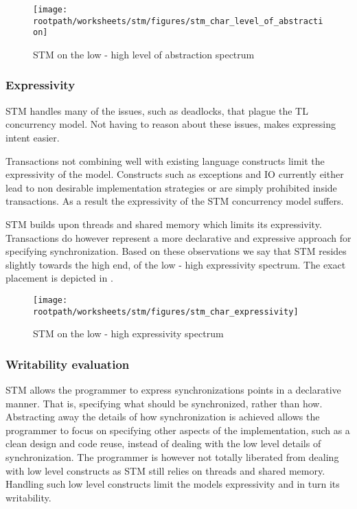 \begin{figure}[htbp]
\centering
 \texttt{[image: \\rootpath/worksheets/stm/figures/stm\_char\_level\_of\_abstraction]} 
 \caption{\ac{STM} on the low - high level of abstraction spectrum}
\label{fig:char_stm_level_of_abstraction}
\end{figure}

\subsubsection{Expressivity}\label{sec:stm_expressivity}

\ac{STM} handles many of the issues, such as deadlocks, that plague the \ac{TL} concurrency model. Not having to reason about these issues, makes expressing intent easier. 

Transactions not combining well with existing language constructs limit the expressivity of the model. Constructs such as exceptions and \ac{IO} currently either lead to non desirable implementation strategies or are simply prohibited inside transactions. As a result the expressivity of the \ac{STM} concurrency model suffers.

\ac{STM} builds upon threads and shared memory which limits its expressivity. Transactions do however represent a more declarative and expressive approach for specifying synchronization. Based on these observations we say that \ac{STM} resides slightly towards the high end, of the low - high expressivity spectrum. The exact placement is depicted in .

\begin{figure}[htbp]
\centering
 \texttt{[image: \\rootpath/worksheets/stm/figures/stm\_char\_expressivity]} 
 \caption{\ac{STM} on the low - high expressivity spectrum}
\label{fig:char_stm_expressivity}
\end{figure}

\subsubsection{Writability evaluation}
\ac{STM} allows the programmer to express synchronizations points in a declarative manner. That is, specifying what should be synchronized, rather than how. Abstracting away the details of how synchronization is achieved allows the programmer to focus on specifying other aspects of the implementation, such as a clean design and code reuse, instead of dealing with the low level details of synchronization. The programmer is however not totally liberated from dealing with low level constructs as \ac{STM} still relies on threads and shared memory. Handling such low level constructs limit the models expressivity and in turn its writability.

